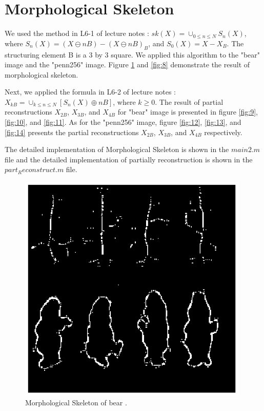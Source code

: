 \documentclass[paper=a4, fontsize=11pt]{scrartcl}
\begin{document}
\section{Morphological Skeleton}

We used the method in L6-1 of lecture notes : $sk(X) = \cup_{0 \leq n \leq N} S_n(X)$, where $S_n(X) = (X \ominus nB) - (X \ominus nB)_B$, and $S_0(X) = X - X_B$. The structuring element B is a 3 by 3 square. We applied this algorithm to the "bear" image and the "penn256" image. Figure \ref{fig:7} and \ref{fig:8} demonstrate the result of morphological skeleton. 

Next, we applied the formula in L6-2 of lecture notes : $X_{kB} =  \cup_{k \leq n \leq N} [ S_n(X) \oplus nB ] $, where $k \geq 0$. The result of  partial reconstructions $X_{2B}$, $X_{3B}$, and $X_{4B}$ for "bear" image is presented in figure  \ref{fig:9},  \ref{fig:10}, and  \ref{fig:11}. As for the "penn256" image, figure  \ref{fig:12},  \ref{fig:13}, and  \ref{fig:14} presents the partial reconstructions $X_{2B}$, $X_{3B}$, and $X_{4B}$ respectively.


The detailed implementation of Morphological Skeleton is shown in the $main2.m $ file and the detailed implementation of partially reconstruction is shown in the $part_Reconstruct.m$ file. 

\begin{figure}
	\centering
	\includegraphics[width=11cm]{SKbear.eps}
	\caption{Morphological Skeleton of bear .}
	\label{fig:7}
\end{figure}
\end{document}
